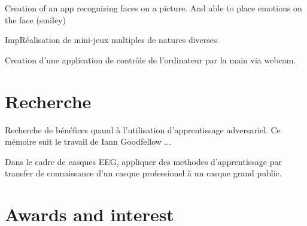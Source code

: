 \documentclass[letterpaper]{deedy-resume} %
\begin{document}
\begin{minipage}[t]{0.66\textwidth}
\sectionspace %



\begin{tightitemize}
\item Creation of an app recognizing faces on a picture. And able to place emotions on the face (smiley)
\item ImpRéalisation de mini-jeux multiples de natures diverses.
\item Creation d'une application de contrôle de l’ordinateur par la main via webcam.
\end{tightitemize}

\sectionspace %


\section{Recherche}


Recherche de bénéfices quand à l'utilisation d'apprentissage adversariel. Ce mémoire suit le travail de Iann Goodfellow ...

\sectionspace %



Dans le cadre de casques EEG, appliquer des methodes d'apprentissage par transfer de connaissance d'un casque professionel à un casque grand public.

\sectionspace %


\section{Awards and interest} 


\end{minipage}
\end{document}
